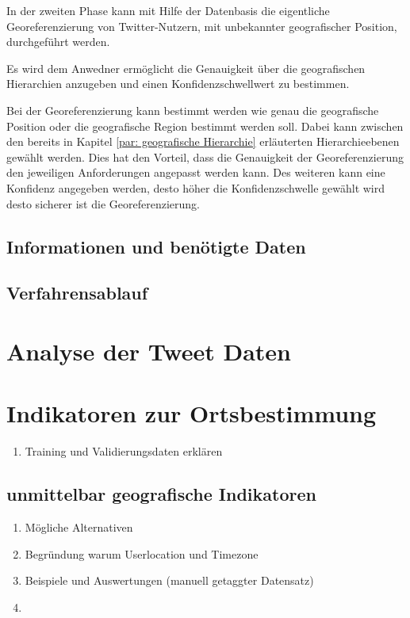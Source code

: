 	In der zweiten Phase kann mit Hilfe der Datenbasis die eigentliche Georeferenzierung von Twitter-Nutzern, mit unbekannter geografischer Position, durchgeführt werden. 

	Es wird dem Anwedner ermöglicht die Genauigkeit über die geografischen Hierarchien anzugeben und einen Konfidenzschwellwert zu bestimmen.


	Bei der Georeferenzierung kann bestimmt werden wie genau die geografische Position oder die geografische Region bestimmt werden soll. 
	Dabei kann zwischen den bereits in Kapitel \ref{par: geografische Hierarchie} erläuterten Hierarchieebenen gewählt werden.
	Dies hat den Vorteil, dass die Genauigkeit der Georeferenzierung den jeweiligen Anforderungen angepasst werden kann.
	Des weiteren kann eine Konfidenz angegeben werden, desto höher die Konfidenzschwelle gewählt wird desto sicherer ist die Georeferenzierung. 







	\subsection{Informationen und benötigte Daten}

	\subsection{Verfahrensablauf}


\section{Analyse der Tweet Daten}

\section{Indikatoren zur Ortsbestimmung}

	\begin{enumerate}
		\item{Training und Validierungsdaten erklären} 
	\end{enumerate}


	\subsection{unmittelbar geografische Indikatoren}
		\begin{enumerate}
			\item Mögliche Alternativen
			\item Begründung warum Userlocation und Timezone
			\item Beispiele und Auswertungen (manuell getaggter Datensatz)
			\item \cite{Hecht2011} 
		\end{enumerate}

